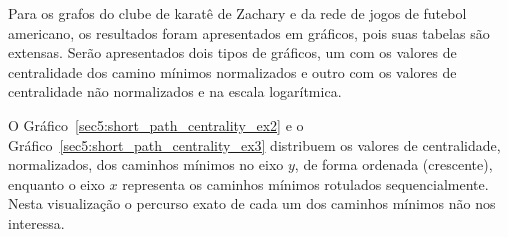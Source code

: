 \begin{table}[!htp]
	\centering
	\caption{Valores de centralidade do grafo simples, Algoritmo~\ref{sec4:funcao_simple_graph_generator}.}
	\label{sec5:centralidade_grafo_teste}
\end{table}

\newpage

Para os grafos do clube de karatê de Zachary e da rede de jogos de futebol americano, os resultados foram apresentados em gráficos, pois suas tabelas são extensas. Serão apresentados dois tipos de gráficos, um com os valores de centralidade dos camino mínimos normalizados e outro com os valores de centralidade não normalizados e na escala logarítmica.

O Gráfico~\ref{sec5:short_path_centrality_ex2} e o Gráfico~\ref{sec5:short_path_centrality_ex3} distribuem os valores de centralidade, normalizados, dos caminhos mínimos no eixo $y$, de forma ordenada (crescente), enquanto o eixo $x$ representa os caminhos mínimos rotulados sequencialmente. Nesta visualização o percurso exato de cada um dos caminhos mínimos não nos interessa.

